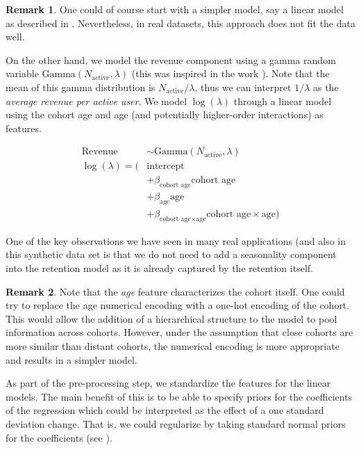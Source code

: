 \documentclass[11pt]{amsart}
\theoremstyle{definition}
\newtheorem{remark}{Remark}
\begin{document}
\begin{remark}
One could of course start with a simpler model, say a linear model as described in
\cite{orduz_revenue_retention}. Nevertheless, in real datasets, this approach does not
fit the data well. 
\end{remark}

On the other hand, we model the revenue component using a gamma random variable
$\text{Gamma}(N_{\text{active}}, \lambda)$ (this was inspired in the work
\cite{stucchio2015bayesian}). Note that the mean of this gamma distribution is
$N_{\text{active}} / \lambda$, thus we can interpret $1 / \lambda$ as the
{\em average revenue per active user}. We model $\log(\lambda)$ through a linear model
using the cohort age and age (and potentially higher-order interactions) as
features. 

\begin{align*}
    \text{Revenue} & \sim \text{Gamma}(N_{\text{active}}, \lambda) \\
    \log(\lambda) = (& \text{intercept} \\
        & + \beta_{\text{cohort age}} \text{cohort age} \\
        & + \beta_{\text{age}} \text{age} \\
        & + \beta_{\text{cohort age} \times \text{age}} \text{cohort age} \times \text{age})
\end{align*}

One of the key observations we have seen in many real applications (and also
in this synthetic data set is that we do not need to add a seasonality component into
the retention model as it is already captured by the retention itself.

\begin{remark}
Note that the {\em age} feature characterizes the cohort itself. One could try to replace
the age numerical encoding with a one-hot encoding of the cohort. This would allow the 
addition of a hierarchical structure to the model to pool information across cohorts.
However, under the assumption that close cohorts are more similar than distant cohorts,
the numerical encoding is more appropriate and results in a simpler model.
\end{remark}

As part of the pre-processing step, we standardize the features for the linear models.
The main benefit of this is to be able to specify priors for the coefficients of the
regression which could be interpreted as the effect of a one standard deviation change.
That is, we could regularize by taking standard normal priors for the coefficients (see
\cite{orduz_retention_bart}). \\
\end{document}
